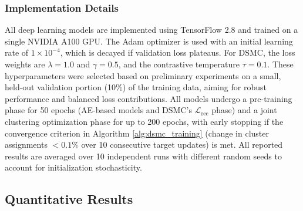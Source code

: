 \documentclass[journal]{IEEEtran}
\begin{document}
\subsubsection{Implementation Details}
All deep learning models are implemented using TensorFlow 2.8 and trained on a single NVIDIA A100 GPU. The Adam optimizer \cite{kingma2014adam} is used with an initial learning rate of $1 \times 10^{-4}$, which is decayed if validation loss plateaus. For DSMC, the loss weights are $\lambda=1.0$ and $\gamma=0.5$, and the contrastive temperature $\tau=0.1$. These hyperparameters were selected based on preliminary experiments on a small, held-out validation portion (10\%) of the training data, aiming for robust performance and balanced loss contributions. All models undergo a pre-training phase for 50 epochs (AE-based models and DSMC's $\mathcal{L}_{\text{rec}}$ phase) and a joint clustering optimization phase for up to 200 epochs, with early stopping if the convergence criterion in Algorithm \ref{alg:dsmc_training} (change in cluster assignments $<0.1\%$ over 10 consecutive target updates) is met. All reported results are averaged over 10 independent runs with different random seeds to account for initialization stochasticity.

\subsection{Quantitative Results}

\begin{table}[h!]
\centering
\caption{Clustering Performance Comparison on the Pecan Street Dataset. Mean values over 10 runs are reported. Standard deviations were typically below 0.015 for ACC/NMI/ARI for deep models. Best results are highlighted in bold.}
\label{tab:main_results}
\end{table}
\end{document}
